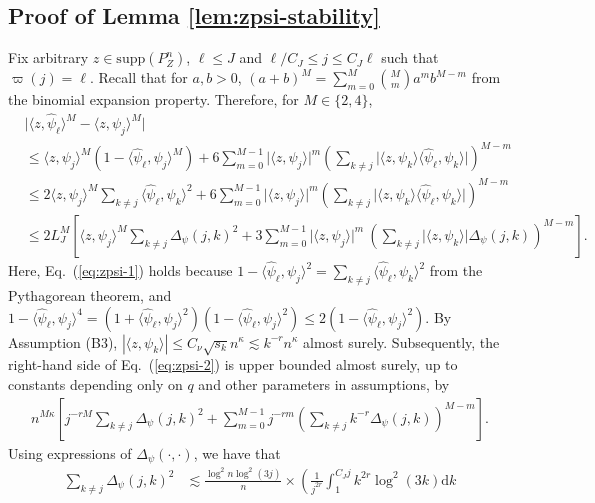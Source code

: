 \documentclass[aos]{imsart}
\renewcommand{\hat}{\widehat}
\newcommand{\supp}{\mathrm{supp}}
\newcommand{\ud}{\mathrm d}
\theoremstyle{plain}
\theoremstyle{definition}
\theoremstyle{definition}
\begin{document}
\begin{appendix}
\subsection{Proof of Lemma \ref{lem:zpsi-stability}}
Fix arbitrary $z\in\supp(P_Z^n)$, $\ell\leq J$ and $\ell/C_J\leq j\leq C_J\ell$ such that $\varpi(j)=\ell$. 
Recall that for $a,b>0$, $(a+b)^M = \sum_{m=0}^M \binom{M}{m}a^mb^{M-m}$ from the binomial expansion property.
Therefore, for $M\in\{2,4\}$, 
\begin{align}
&\big|\langle z,\hat\psi_\ell\rangle^M-\langle z,\psi_j\rangle^M\big|\nonumber\\
& \leq \langle z,\psi_j\rangle^M(1-\langle\hat\psi_\ell,\psi_j\rangle^M) + 6\sum_{m=0}^{M-1}\big|\langle z,\psi_j\rangle\big|^m\left(\sum_{k\neq j}\big|\langle z,\psi_k\rangle\langle\hat\psi_\ell,\psi_k\rangle\big|\right)^{M-m}\nonumber\\
&\leq 2\langle z,\psi_j\rangle^M\sum_{k\neq j}\langle\hat\psi_\ell,\psi_k\rangle^2 +  6\sum_{m=0}^{M-1}\big|\langle z,\psi_j\rangle\big|^m\left(\sum_{k\neq j}\big|\langle z,\psi_k\rangle\langle\hat\psi_\ell,\psi_k\rangle\big|\right)^{M-m}\label{eq:zpsi-1}\\
&\leq 2L_J^M\left[\langle z,\psi_j\rangle^M\sum_{k\neq j}\Delta_\psi(j,k)^2 +3\sum_{m=0}^{M-1}\big|\langle z,\psi_j\rangle\big|^m\ \left(\sum_{k\neq j}\big|\langle z,\psi_k\rangle\big|\Delta_\psi(j,k)\right)^{M-m} \right].\label{eq:zpsi-2}
\end{align}
Here, Eq.~(\ref{eq:zpsi-1}) holds because $1-\langle\hat\psi_\ell,\psi_j\rangle^2=\sum_{k\neq j}\langle\hat\psi_\ell,\psi_k\rangle^2$ from the Pythagorean theorem,
and $1-\langle\hat\psi_\ell,\psi_j\rangle^4 = (1+\langle\hat\psi_\ell,\psi_j\rangle^2)(1-\langle\hat\psi_\ell,\psi_j\rangle^2) \leq 2(1-\langle\hat\psi_\ell,\psi_j\rangle^2)$. 
By Assumption (B3), $|\langle z,\psi_k\rangle|\leq C_\nu\sqrt{s_k}n^{\kappa} \lesssim k^{-r}n^{\kappa}$ almost surely.
Subsequently, the right-hand side of Eq.~(\ref{eq:zpsi-2}) is upper bounded almost surely, up to constants depending only on $q$ and other parameters in assumptions, by
\begin{align}
 n^{M\kappa}\left[j^{-rM}\sum_{k\neq j}\Delta_\psi(j,k)^2 + \sum_{m=0}^{M-1} j^{-rm}\left(\sum_{k\neq j}k^{-r}\Delta_\psi(j,k)\right)^{M-m} \right].
 \label{eq:zpsi-3}
\end{align}
Using expressions of $\Delta_\psi(\cdot,\cdot)$, we have that
\begin{align}
\sum_{k\neq j}\Delta_\psi(j,k)^2 &\lesssim \frac{\log^2 n\log^2(3j)}{n}\times \left( \frac{1}{j^{2r}}\int_1^{C_J j} k^{2r}\log^2(3k)\ud k \right.\nonumber\\

\end{align}
\end{appendix}
\end{document}
